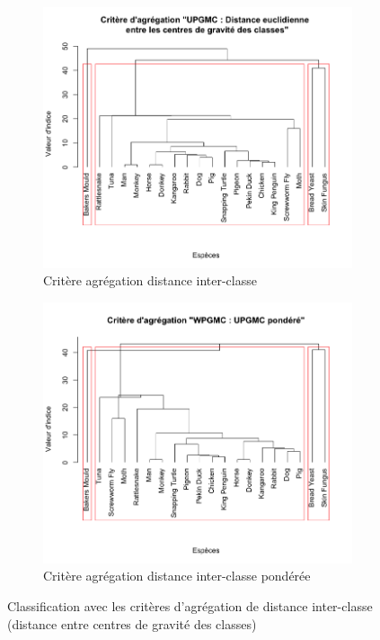 \documentclass[a4paper,10pt]{report}
\begin{document}
\begin{figure}[H]
	\centering
	\captionsetup{justification=centering, margin=3cm}
	\begin{subfigure}[b]{0.4\linewidth}
		\centering
		\captionsetup{justification=centering}
		\includegraphics[width=1\linewidth]{img/2-1-mut-hierarchie-centroid}
		\caption{\small Critère agrégation distance inter-classe}
		\label{fig:2-1-mut-hierarchie-centroid}
	\end{subfigure}%
	\begin{subfigure}[b]{0.4\linewidth}
		\centering
		\captionsetup{justification=centering}
		\includegraphics[width=1\linewidth]{img/2-1-mut-hierarchie-centroid-ponderee}
		\caption{\small Critère agrégation distance inter-classe pondérée}
		\label{fig:2-1-mut-hierarchie-centroid-ponderee}
	\end{subfigure}%
	\caption{\small Classification avec les critères d'agrégation de distance inter-classe (distance entre centres de gravité des classes)}
	\label{fig:2-1-classification-mut-centroid}%
\end{figure}
\end{document}
